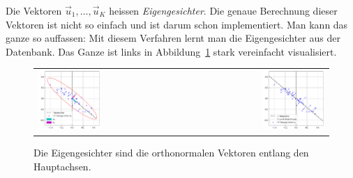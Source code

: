 Die Vektoren $\vec u_1,\ldots,\vec u_K$ heissen \textit{Eigengesichter}.
Die genaue Berechnung dieser Vektoren ist nicht so einfach und ist darum schon implementiert.
Man kann das ganze so auffassen: Mit diesem Verfahren \glqq{}lernt\grqq{} man die Eigengesichter aus der Datenbank.
Das Ganze ist links in Abbildung~\ref{fig:construction} stark vereinfacht visualisiert.
\begin{figure}[ht]
	\centering
	\begin{tabular}{lr}
		\includegraphics[width=0.45\textwidth]{images/facespace/principal_components} & \includegraphics[width=0.45\textwidth]{images/facespace/distance_complicated} \\
	\end{tabular}
	\caption{Die Eigengesichter sind die orthonormalen Vektoren entlang den Hauptachsen.}
	\label{fig:construction}
\end{figure}

